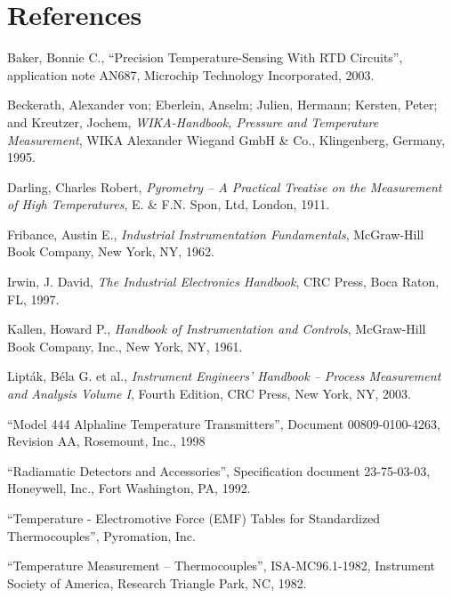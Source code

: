 \filbreak
\section*{References}


\noindent
Baker, Bonnie C., ``Precision Temperature-Sensing With RTD Circuits'', application note AN687, Microchip Technology Incorporated, 2003.

\vskip 10pt

\noindent
Beckerath, Alexander von; Eberlein, Anselm; Julien, Hermann; Kersten, Peter; and Kreutzer, Jochem, \textit{WIKA-Handbook, Pressure and Temperature Measurement}, WIKA Alexander Wiegand GmbH \& Co., Klingenberg, Germany, 1995.

\vskip 10pt

\noindent
Darling, Charles Robert, \textit{Pyrometry -- A Practical Treatise on the Measurement of High Temperatures}, E. \& F.N. Spon, Ltd, London, 1911.

\vskip 10pt

\noindent
Fribance, Austin E., \textit{Industrial Instrumentation Fundamentals}, McGraw-Hill Book Company, New York, NY, 1962.

\vskip 10pt

\noindent
Irwin, J. David, \textit{The Industrial Electronics Handbook}, CRC Press, Boca Raton, FL, 1997.

\vskip 10pt

\noindent
Kallen, Howard P., \textit{Handbook of Instrumentation and Controls}, McGraw-Hill Book Company, Inc., New York, NY, 1961.

\vskip 10pt

\noindent
Lipt\'ak, B\'ela G. et al., \textit{Instrument Engineers' Handbook -- Process Measurement and Analysis Volume I}, Fourth Edition, CRC Press, New York, NY, 2003.

\vskip 10pt

\noindent
``Model 444 Alphaline Temperature Transmitters'', Document 00809-0100-4263, Revision AA, Rosemount, Inc., 1998

\vskip 10pt

\noindent
``Radiamatic Detectors and Accessories'', Specification document 23-75-03-03, Honeywell, Inc., Fort Washington, PA, 1992.

\vskip 10pt

\noindent
``Temperature - Electromotive Force (EMF) Tables for Standardized Thermocouples'', Pyromation, Inc.

\vskip 10pt

\noindent
``Temperature Measurement -- Thermocouples'', ISA-MC96.1-1982, Instrument Society of America, Research Triangle Park, NC, 1982.











